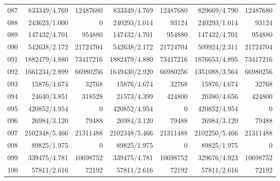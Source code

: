 \begin{longtable}{crrrrrr}
087 & 833349/4.769 & 12487680 & 833349/4.769 & 12487680 & 829669/4.790 & 12487680 \\
088 & 243623/1.000 & 0 & 240293/1.014 & 93124 & 240293/1.014 & 93124 \\
089 & 147432/4.701 & 954880 & 147432/4.701 & 954880 & 147432/4.701 & 954880 \\
090 & 542638/2.172 & 21724704 & 542638/2.172 & 21724704 & 509924/2.311 & 21724704 \\
091 & 1882479/4.880 & 73417216 & 1882479/4.880 & 73417216 & 1876653/4.895 & 73417216 \\
092 & 1661234/2.899 & 66980256 & 1649430/2.920 & 66980256 & 1351088/3.564 & 66980256 \\
093 & 15876/4.674 & 32768 & 15876/4.674 & 32768 & 15876/4.674 & 32768 \\
094 & 24640/3.851 & 318528 & 21573/4.399 & 424800 & 20380/4.656 & 424800 \\
095 & 420852/4.954 & 0 & 420852/4.954 & 0 & 420852/4.954 & 0 \\
096 & 26984/3.120 & 79488 & 26984/3.120 & 79488 & 26984/3.120 & 79488 \\
097 & 2102348/5.466 & 21311488 & 2102348/5.466 & 21311488 & 2102250/5.466 & 21311488 \\
098 & 89825/1.975 & 0 & 89825/1.975 & 0 & 89825/1.975 & 0 \\
099 & 339475/4.781 & 10698752 & 339475/4.781 & 10698752 & 329676/4.923 & 10698752 \\
100 & 57811/2.616 & 72192 & 57811/2.616 & 72192 & 57811/2.616 & 72192 \\
\end{longtable}
